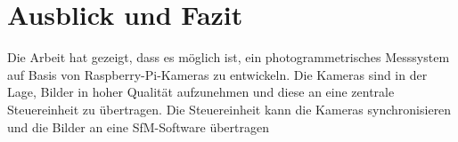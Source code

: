\documentclass[./00PhotoBox.tex]{subfiles}
\begin{document}
\chapter{Ausblick und Fazit}

Die Arbeit hat gezeigt, dass es möglich ist, ein photogrammetrisches Messsystem auf Basis von Raspberry-Pi-Kameras zu entwickeln. Die Kameras sind in der Lage, Bilder in hoher Qualität aufzunehmen und diese an eine zentrale Steuereinheit zu übertragen. Die Steuereinheit kann die Kameras synchronisieren und die Bilder an eine \gls{SfM}-Software übertragen




\biblio
\end{document}
